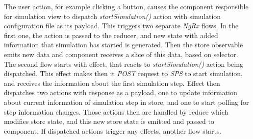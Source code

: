 The user action, for example clicking a button, causes the component responsible for simulation view to dispatch \textit{startSimulation()} action with simulation configuration file as its payload. This triggers two separate \textit{NgRx} flows. In the first one, the action is passed to the reducer, and new state with added information that simulation has started is generated. Then the store observable emits new data and component receives a slice of this data, based on selector. The second flow starts with effect, that reacts to \textit{startSimulation()} action being dispatched. This effect makes then it \textit{POST} request to \textit{SPS} to start simulation, and receives the information about the first simulation step. Effect then dispatches two actions with response as a payload, one to update information about current information of simulation step in store, and one to start polling for step information changes. Those actions then are handled by reduce which modifies store state, and this new store state is emitted and passed to component. If dispatched actions trigger any effects, another flow starts.
